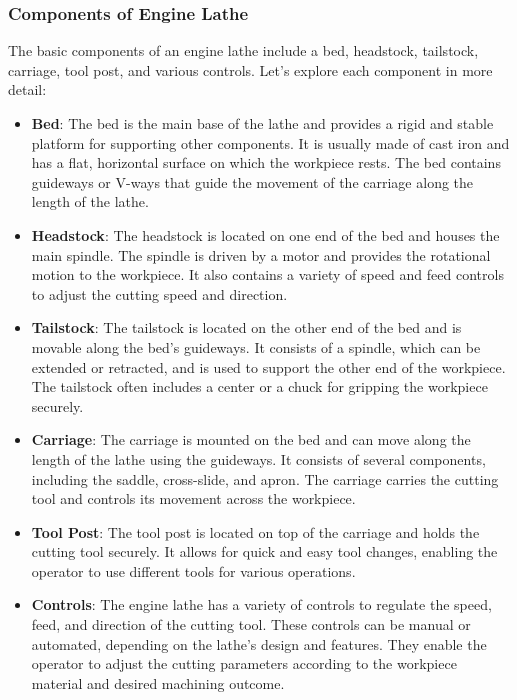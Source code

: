 \documentclass{article}
\begin{document}
\subsubsection*{Components of Engine Lathe}
The basic components of an engine lathe include a bed, headstock, tailstock, carriage, tool post, and various controls. Let's explore each component in more detail:
\begin{itemize}
  \item \textbf{Bed}: The bed is the main base of the lathe and provides a rigid and stable platform for supporting other components. It is usually made of cast iron and has a flat, horizontal surface on which the workpiece rests. The bed contains guideways or V-ways that guide the movement of the carriage along the length of the lathe.
  \item \textbf{Headstock}: The headstock is located on one end of the bed and houses the main spindle. The spindle is driven by a motor and provides the rotational motion to the workpiece. It also contains a variety of speed and feed controls to adjust the cutting speed and direction.
  \item \textbf{Tailstock}: The tailstock is located on the other end of the bed and is movable along the bed's guideways. It consists of a spindle, which can be extended or retracted, and is used to support the other end of the workpiece. The tailstock often includes a center or a chuck for gripping the workpiece securely.
  \item \textbf{Carriage}: The carriage is mounted on the bed and can move along the length of the lathe using the guideways. It consists of several components, including the saddle, cross-slide, and apron. The carriage carries the cutting tool and controls its movement across the workpiece.
  \item \textbf{Tool Post}: The tool post is located on top of the carriage and holds the cutting tool securely. It allows for quick and easy tool changes, enabling the operator to use different tools for various operations.
  \item \textbf{Controls}: The engine lathe has a variety of controls to regulate the speed, feed, and direction of the cutting tool. These controls can be manual or automated, depending on the lathe's design and features. They enable the operator to adjust the cutting parameters according to the workpiece material and desired machining outcome.
\end{itemize}
\end{document}
